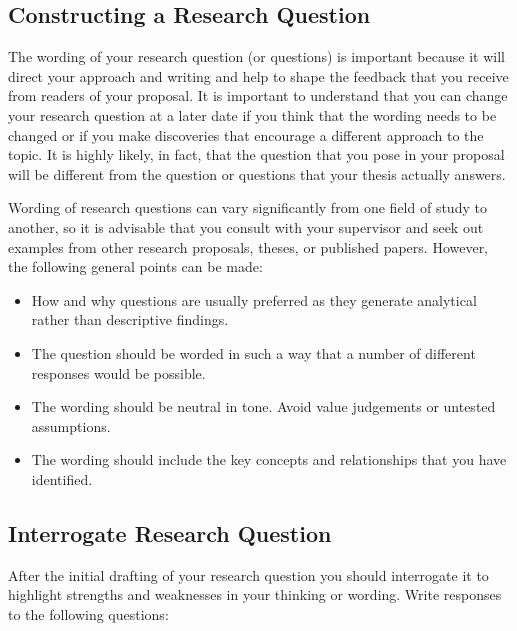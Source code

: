 \documentclass[12pt, a4paper]{article}
\begin{document}
\subsection{Constructing a Research Question}
The wording of your research question (or questions) is important because it will direct your approach and writing and help to shape the feedback that you receive from readers of your proposal. It is important to understand that you can change your research question at a later date if you think that the wording needs to be changed or if you make discoveries that encourage a different approach to the topic. It is highly likely, in fact, that the question that you pose in your proposal will be different from the question or questions that your thesis actually answers.

Wording of research questions can vary significantly from one field of study to another, so it is advisable that you consult with your supervisor and seek out examples from other research proposals, theses, or published papers. However, the following general points can be made:

\begin{itemize}
\item How and why questions are usually preferred as they generate analytical rather than descriptive findings.
\item The question should be worded in such a way that a number of different responses would be possible.
\item The wording should be neutral in tone. Avoid value judgements or untested assumptions.
\item The wording should include the key concepts and relationships that you have identified.
\end{itemize}

\subsection{Interrogate Research Question}
After the initial drafting of your research question you should interrogate it to highlight strengths and weaknesses in your thinking or wording. Write responses to the following questions: 
\end{document}
